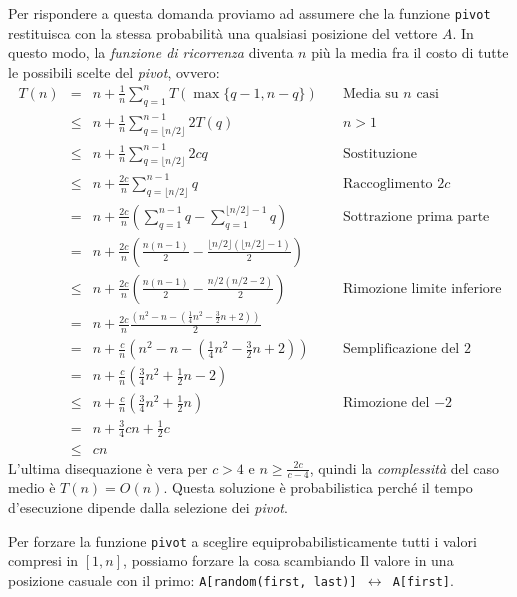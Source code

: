 Per rispondere a questa domanda proviamo ad assumere che la funzione
\texttt{pivot} restituisca con la stessa probabilità una qualsiasi posizione
del vettore $A$. In questo modo, la \emph{funzione di ricorrenza} diventa
$n$ più la media fra il costo di tutte le possibili scelte del \emph{pivot},
ovvero:
\[\begin{array}{rcll}
    T(n) & = & n+\frac{1}{n}\sum_{q=1}^n T(\max\{q-1,n-q\}) & \quad\text{Media su $n$ casi}\\
    & \leq & n+\frac{1}{n}\sum_{q=\lfloor n/2\rfloor}^{n-1}2T(q) & \quad n>1\\
    & \leq & n+\frac{1}{n}\sum_{q=\lfloor n/2\rfloor}^{n-1}2cq & \quad\text{Sostituzione}\\
    & \leq & n+\frac{2c}{n}\sum_{q=\lfloor n/2\rfloor}^{n-1}q & \quad\text{Raccoglimento $2c$}\\
    & = & n+\frac{2c}{n}\left(\sum_{q=1}^{n-1}q-\sum_{q=1}^{\lfloor n/2\rfloor-1}q\right) & \quad\text{Sottrazione prima parte}\\
    & = & n+\frac{2c}{n}\left(\frac{n(n-1)}{2}-\frac{\lfloor n/2\rfloor
    \left(\lfloor n/2\rfloor -1\right)}{2}\right)\\
    & \leq & n+\frac{2c}{n}\left(\frac{n(n-1)}{2}-\frac{n/2\left(n/2-2\right)}{2}
    \right) & \quad\text{Rimozione limite inferiore}\\
    & = & n+\frac{2c}{n}\frac{\left(n^2-n-\left(\frac{1}{4}n^2-\frac{3}{2}n+2\right)\right)}{2}\\
    & = & n+\frac{c}{n}\left(n^2-n-\left(\frac{1}{4}n^2-\frac{3}{2}n+2\right)\right) & \quad\text{Semplificazione del $2$}\\
    & = & n+\frac{c}{n}\left(\frac{3}{4}n^2+\frac{1}{2}n-2\right)\\
    & \leq & n+\frac{c}{n}\left(\frac{3}{4}n^2+\frac{1}{2}n\right) & \quad\text{Rimozione del $-2$}\\
    & = &n+\frac{3}{4}cn+\frac{1}{2}c\\
    & \leq & cn
\end{array}\]
L'ultima disequazione è vera per $c>4$ e $n\geq\frac{2c}{c-4}$, quindi la \emph{complessità}
del caso medio è $T(n)=O(n)$. Questa soluzione è probabilistica perché il tempo
d'esecuzione dipende dalla selezione dei \emph{pivot}.

\begin{note}
    Per forzare la funzione \texttt{pivot} a sceglire equiprobabilisticamente
    tutti i valori compresi in $[1,n]$, possiamo forzare la cosa scambiando Il
    valore in una posizione casuale con il primo: \texttt{A[random(first, last)]
    $\leftrightarrow$ A[first]}\footnotemark.
\end{note}

